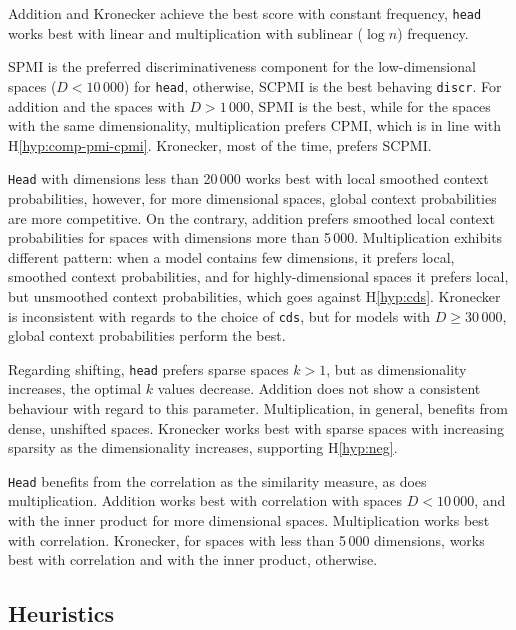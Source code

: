 Addition and Kronecker achieve the best score with constant frequency, \texttt{head} works best with linear and multiplication with sublinear ($\log n$) frequency.

SPMI is the preferred discriminativeness component for the low-dimensional spaces ($D < 10\,000$) for \texttt{head}, otherwise, SCPMI is the best behaving \texttt{discr}. For addition and the spaces with $D > 1\,000$, SPMI is the best, while for the spaces with the same dimensionality, multiplication prefers CPMI, which is in line with H\ref{hyp:comp-pmi-cpmi}. Kronecker, most of the time, prefers SCPMI.

\texttt{Head} with dimensions less than 20\,000 works best with local smoothed context probabilities, however, for more dimensional spaces, global context probabilities are more competitive. On the contrary, addition prefers smoothed local context probabilities for spaces with dimensions more than 5\,000. Multiplication exhibits different pattern: when a model contains few dimensions, it prefers local, smoothed context probabilities, and for highly-dimensional spaces it prefers local, but unsmoothed context probabilities, which goes against H\ref{hyp:cds}. Kronecker is inconsistent with regards to the choice of \texttt{cds}, but for models with $D \geq 30\,000$, global context probabilities perform the best.

Regarding shifting, \texttt{head} prefers sparse spaces $k > 1$, but as dimensionality increases, the optimal $k$ values decrease. Addition does not show a consistent behaviour with regard to this parameter. Multiplication, in general, benefits from dense, unshifted spaces. Kronecker works best with sparse spaces with increasing sparsity as the dimensionality increases, supporting H\ref{hyp:neg}.



\texttt{Head} benefits from the correlation as the similarity measure, as does multiplication. Addition works best with correlation with spaces $D < 10\,000$, and with the inner product for more dimensional spaces. Multiplication works best with correlation. Kronecker, for spaces with less than 5\,000 dimensions, works best with correlation and with the inner product, otherwise.

\subsection{Heuristics}
\label{sec:heuristics-phraserel}


